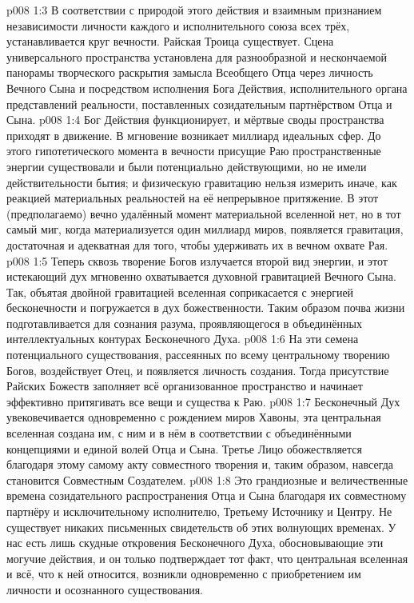 \vs p008 1:3 В соответствии с природой этого действия и взаимным признанием независимости личности каждого и исполнительного союза всех трёх, устанавливается круг вечности. Райская Троица существует. Сцена универсального пространства установлена для разнообразной и нескончаемой панорамы творческого раскрытия замысла Всеобщего Отца через личность Вечного Сына и посредством исполнения Бога Действия, исполнительного органа представлений реальности, поставленных созидательным партнёрством Отца и Сына.
\vs p008 1:4 \pc Бог Действия функционирует, и мёртвые своды пространства приходят в движение. В мгновение возникает миллиард идеальных сфер. До этого гипотетического момента в вечности присущие Раю пространственные энергии существовали и были потенциально действующими, но не имели действительности бытия; и физическую гравитацию нельзя измерить иначе, как реакцией материальных реальностей на её непрерывное притяжение. В этот (предполагаемо) вечно удалённый момент материальной вселенной нет, но в тот самый миг, когда материализуется один миллиард миров, появляется гравитация, достаточная и адекватная для того, чтобы удерживать их в вечном охвате Рая.
\vs p008 1:5 Теперь сквозь творение Богов излучается второй вид энергии, и этот истекающий дух мгновенно охватывается духовной гравитацией Вечного Сына. Так, объятая двойной гравитацией вселенная соприкасается с энергией бесконечности и погружается в дух божественности. Таким образом почва жизни подготавливается для сознания разума, проявляющегося в объединённых интеллектуальных контурах Бесконечного Духа.
\vs p008 1:6 На эти семена потенциального существования, рассеянных по всему центральному творению Богов, воздействует Отец, и появляется личность создания. Тогда присутствие Райских Божеств заполняет всё организованное пространство и начинает эффективно притягивать все вещи и существа к Раю.
\vs p008 1:7 \pc Бесконечный Дух увековечивается одновременно с рождением миров Хавоны, эта центральная вселенная создана им, с ним и в нём в соответствии с объединёнными концепциями и единой волей Отца и Сына. Третье Лицо обожествляется благодаря этому самому акту совместного творения и, таким образом, навсегда становится Совместным Создателем.
\vs p008 1:8 \pc Это грандиозные и величественные времена созидательного распространения Отца и Сына благодаря их совместному партнёру и исключительному исполнителю, Третьему Источнику и Центру. Не существует никаких письменных свидетельств об этих волнующих временах. У нас есть лишь скудные откровения Бесконечного Духа, обосновывающие эти могучие действия, и он только подтверждает тот факт, что центральная вселенная и всё, что к ней относится, возникли одновременно с приобретением им личности и осознанного существования.
